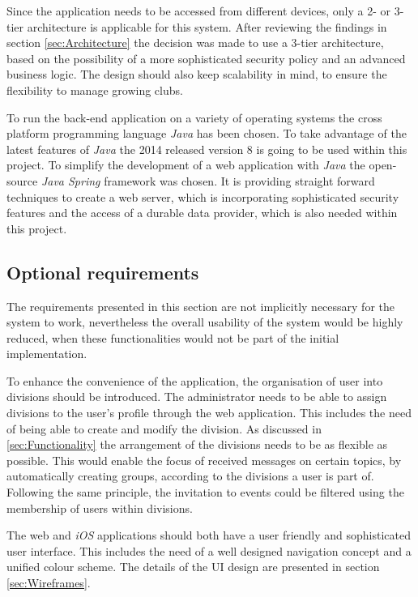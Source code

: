 Since the application needs to be accessed from different devices, only a 2- or 3-tier architecture is applicable for this system. After reviewing the findings in section \vref{sec:Architecture} the decision was made to use a 3-tier architecture, based on the possibility of a more sophisticated security policy and an advanced business logic. The design should also keep scalability in mind, to ensure the flexibility to manage growing clubs.

To run the back-end application on a variety of operating systems the cross platform programming language \emph{Java} has been chosen. To take advantage of the latest features of \emph{Java} the 2014 released version 8 is going to be used within this project. To simplify the development of a web application with \emph{Java} the open-source \emph{Java Spring} framework was chosen. It is providing straight forward techniques to create a web server, which is incorporating sophisticated security features and the access of a durable data provider, which is also needed within this project.

\subsection{Optional requirements} %
The requirements presented in this section are not implicitly necessary for the system to work, nevertheless the overall usability of the system would be highly reduced, when these functionalities would not be part of the initial implementation.

To enhance the convenience of the application, the organisation of user into divisions should be introduced. The administrator needs to be able to assign divisions to the user's profile through the web application. This includes the need of being able to create and modify the division. As discussed in \vref{sec:Functionality} the arrangement of the divisions needs to be as flexible as possible. This would enable the focus of received messages on certain topics, by automatically creating groups, according to the divisions a user is part of. Following the same principle, the invitation to events could be filtered using the membership of users within divisions.

The web and \emph{iOS} applications should both have a user friendly and sophisticated user interface. This includes the need of a well designed navigation concept and a unified colour scheme. The details of the \gls{UI} design are presented in section \vref{sec:Wireframes}. 

